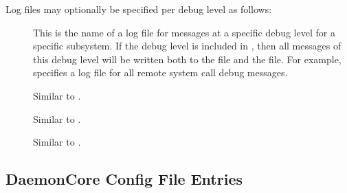 Log files may optionally be specified per debug level as follows:
\begin{description}

\item[] \label{param:SubsysLevelLog} This is
  the name of a log file for messages at a specific debug level for a
  specific subsystem.  If the debug level is included in
  , then all messages of this debug level will be
  written both to the  file and the
   file.  For example,
   specifies a log file for all remote
  system call debug messages.

\item[] \label{param:MaxSubsysLevelLog}
  Similar to .

\item[]
  \label{param:TruncSubsysLevelLogOnOpen} Similar to
  .

\item[] \label{param:SubsysLevelLock}
  Similar to .
  
\end{description}

\subsection{\label{sec:DaemonCore-Config-File-Entries}
DaemonCore Config File Entries}

